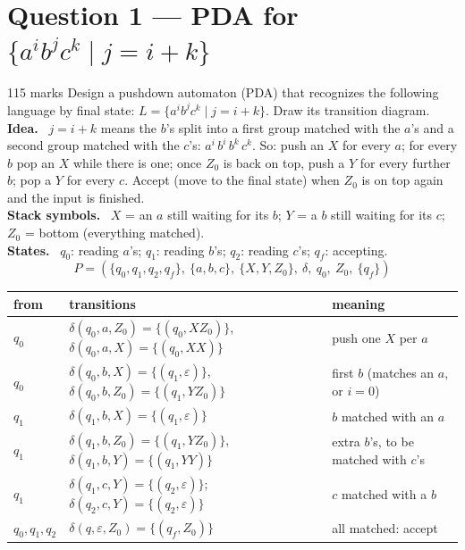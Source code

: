 \documentclass[10.5pt,a4paper]{article}
\newcommand{\ansh}[1]{\textbf{\color{exborder}#1}\ }
\newcommand{\eps}{\varepsilon}
\begin{document}
\section{Question 1 --- PDA for $\{a^ib^jc^k\mid j=i+k\}$}
\begin{qa}{1}{15 marks}
Design a pushdown automaton (PDA) that recognizes the following language by final state: $L=\{a^ib^jc^k\mid j=i+k\}$. Draw its transition diagram.
\tcblower
\ansh{Idea.} $j=i+k$ means the $b$'s split into a first group matched with the $a$'s and a second group matched with the $c$'s:
$a^i\,b^i\,b^k\,c^k$. So: push an $X$ for every $a$; for every $b$ pop an $X$ while there is one; once $Z_0$ is back on top, push a $Y$ for
every further $b$; pop a $Y$ for every $c$. Accept (move to the final state) when $Z_0$ is on top again and the input is finished.\\
\ansh{Stack symbols.} $X$ = an $a$ still waiting for its $b$; $Y$ = a $b$ still waiting for its $c$; $Z_0$ = bottom (everything matched).\\
\ansh{States.} $q_0$: reading $a$'s; $q_1$: reading $b$'s; $q_2$: reading $c$'s; $q_f$: accepting.
\[P=(\{q_0,q_1,q_2,q_f\},\ \{a,b,c\},\ \{X,Y,Z_0\},\ \delta,\ q_0,\ Z_0,\ \{q_f\})\]
\begin{center}\small
\begin{tabular}{@{}lll@{}}
\toprule
from & transitions & meaning\\\midrule
$q_0$ & $\delta(q_0,a,Z_0)=\{(q_0,XZ_0)\}$,\ $\delta(q_0,a,X)=\{(q_0,XX)\}$ & push one $X$ per $a$\\
$q_0$ & $\delta(q_0,b,X)=\{(q_1,\eps)\}$,\ $\delta(q_0,b,Z_0)=\{(q_1,YZ_0)\}$ & first $b$ (matches an $a$, or $i=0$)\\
$q_1$ & $\delta(q_1,b,X)=\{(q_1,\eps)\}$ & $b$ matched with an $a$\\
$q_1$ & $\delta(q_1,b,Z_0)=\{(q_1,YZ_0)\}$,\ $\delta(q_1,b,Y)=\{(q_1,YY)\}$ & extra $b$'s, to be matched with $c$'s\\
$q_1$ & $\delta(q_1,c,Y)=\{(q_2,\eps)\}$;\quad $\delta(q_2,c,Y)=\{(q_2,\eps)\}$ & $c$ matched with a $b$\\
$q_0,q_1,q_2$ & $\delta(q,\eps,Z_0)=\{(q_f,Z_0)\}$ & all matched: accept\\\bottomrule
\end{tabular}
\end{center}
\begin{center}
\begin{tikzpicture}[node distance=3.6cm,every edge/.append style={font=\scriptsize}]

\end{tikzpicture}
\end{center}
\end{qa}
\end{document}
